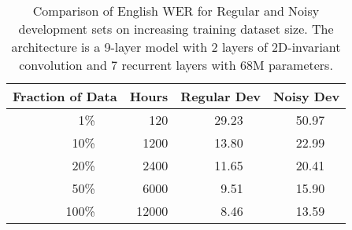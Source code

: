 \begin{table}
\centering
\begin{tabular}{r r r  r  r r r  r r r}
\toprule
\multicolumn{3}{c}{Fraction of Data} & Hours & \multicolumn{3}{c}{Regular Dev} & \multicolumn{3}{c}{Noisy Dev} \\
\midrule
& 1\%   & & 120   & & 29.23 & & & 50.97 & \\
& 10\%  & & 1200  & & 13.80 & & & 22.99 & \\
& 20\%  & & 2400  & & 11.65 & & & 20.41 & \\
& 50\%  & & 6000  & & 9.51  & & & 15.90 & \\
& 100\% & & 12000 & & 8.46  & & & 13.59 & \\
\bottomrule
\end{tabular}
\caption{Comparison of English WER for Regular and Noisy development sets on
         increasing training dataset size. The architecture is a 9-layer model with
         2 layers of 2D-invariant convolution and 7 recurrent layers with 68M
         parameters.}
\label{table:deepspeech2:datascale}
\end{table}
